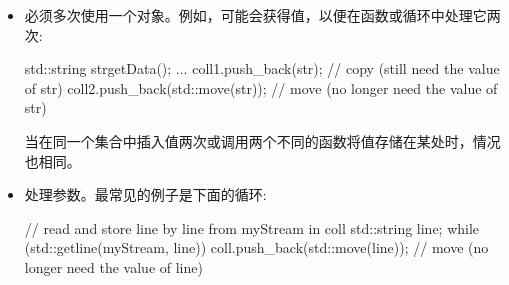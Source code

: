 \begin{itemize}
	\item 必须多次使用一个对象。例如，可能会获得值，以便在函数或循环中处理它两次:

	\begin{cppcode}
std::string str{getData()};
...
coll1.push_back(str); // copy (still need the value of str)
coll2.push_back(std::move(str)); // move (no longer need the value of str)
	\end{cppcode}
	当在同一个集合中插入值两次或调用两个不同的函数将值存储在某处时，情况也相同。
	\item 处理参数。最常见的例子是下面的循环:

	\begin{cppcode}
// read and store line by line from myStream in coll
std::string line;
while (std::getline(myStream, line)) {
	coll.push_back(std::move(line)); // move (no longer need the value of line)
}
	\end{cppcode}
\end{itemize}








